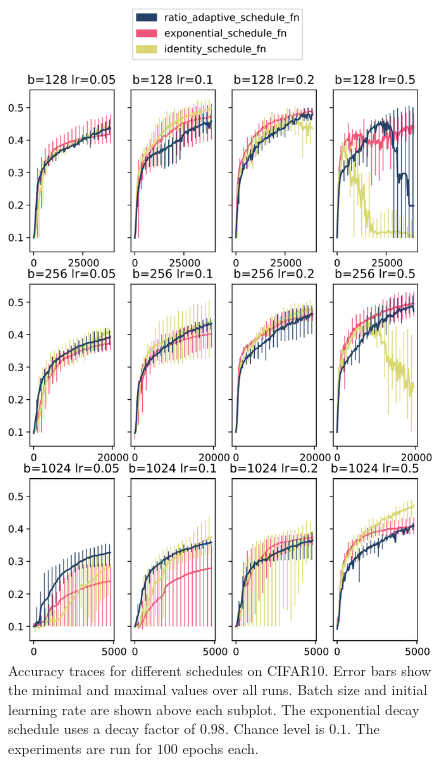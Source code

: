 \begin{figure}
    \centering
    \includegraphics[width=\linewidth]{gfx/diagrams/experiments/ratio_adaptive_accuracies.pdf}
    \caption[Accuracy traces for different schedules on CIFAR-10]{Accuracy
        traces for different schedules on CIFAR10. Error bars show the minimal
        and maximal values over all runs. Batch size and initial learning rate
        are shown above each subplot. The exponential decay schedule uses a
        decay factor of $0.98$. Chance level is $0.1$. The experiments are run
    for $100$ epochs each.}
    \label{fig:schedule-accuracies}
\end{figure}

